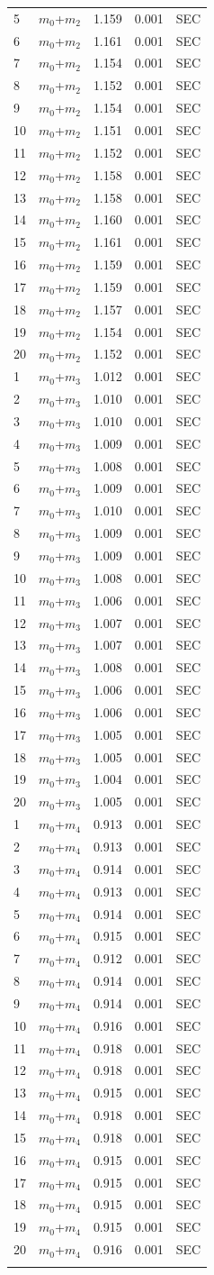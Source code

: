 \documentclass[11pt,a4paper]{article}
\begin{document}
\begin{longtable}[]{@{}lllll@{}}
5 & $m_0$+$m_2$ & 1.159 & 0.001 & SEC \tabularnewline
6 & $m_0$+$m_2$ & 1.161 & 0.001 & SEC \tabularnewline
7 & $m_0$+$m_2$ & 1.154 & 0.001 & SEC \tabularnewline
8 & $m_0$+$m_2$ & 1.152 & 0.001 & SEC \tabularnewline
9 & $m_0$+$m_2$ & 1.154 & 0.001 & SEC \tabularnewline
10 & $m_0$+$m_2$ & 1.151 & 0.001 & SEC \tabularnewline
11 & $m_0$+$m_2$ & 1.152 & 0.001 & SEC \tabularnewline
12 & $m_0$+$m_2$ & 1.158 & 0.001 & SEC \tabularnewline
13 & $m_0$+$m_2$ & 1.158 & 0.001 & SEC \tabularnewline
14 & $m_0$+$m_2$ & 1.160 & 0.001 & SEC \tabularnewline
15 & $m_0$+$m_2$ & 1.161 & 0.001 & SEC \tabularnewline
16 & $m_0$+$m_2$ & 1.159 & 0.001 & SEC \tabularnewline
17 & $m_0$+$m_2$ & 1.159 & 0.001 & SEC \tabularnewline
18 & $m_0$+$m_2$ & 1.157 & 0.001 & SEC \tabularnewline
19 & $m_0$+$m_2$ & 1.154 & 0.001 & SEC \tabularnewline
20 & $m_0$+$m_2$ & 1.152 & 0.001 & SEC \tabularnewline
1 & $m_0$+$m_3$ & 1.012 & 0.001 & SEC \tabularnewline
2 & $m_0$+$m_3$ & 1.010 & 0.001 & SEC \tabularnewline
3 & $m_0$+$m_3$ & 1.010 & 0.001 & SEC \tabularnewline
4 & $m_0$+$m_3$ & 1.009 & 0.001 & SEC \tabularnewline
5 & $m_0$+$m_3$ & 1.008 & 0.001 & SEC \tabularnewline
6 & $m_0$+$m_3$ & 1.009 & 0.001 & SEC \tabularnewline
7 & $m_0$+$m_3$ & 1.010 & 0.001 & SEC \tabularnewline
8 & $m_0$+$m_3$ & 1.009 & 0.001 & SEC \tabularnewline
9 & $m_0$+$m_3$ & 1.009 & 0.001 & SEC \tabularnewline
10 & $m_0$+$m_3$ & 1.008 & 0.001 & SEC \tabularnewline
11 & $m_0$+$m_3$ & 1.006 & 0.001 & SEC \tabularnewline
12 & $m_0$+$m_3$ & 1.007 & 0.001 & SEC \tabularnewline
13 & $m_0$+$m_3$ & 1.007 & 0.001 & SEC \tabularnewline
14 & $m_0$+$m_3$ & 1.008 & 0.001 & SEC \tabularnewline
15 & $m_0$+$m_3$ & 1.006 & 0.001 & SEC \tabularnewline
16 & $m_0$+$m_3$ & 1.006 & 0.001 & SEC \tabularnewline
17 & $m_0$+$m_3$ & 1.005 & 0.001 & SEC \tabularnewline
18 & $m_0$+$m_3$ & 1.005 & 0.001 & SEC \tabularnewline
19 & $m_0$+$m_3$ & 1.004 & 0.001 & SEC \tabularnewline
20 & $m_0$+$m_3$ & 1.005 & 0.001 & SEC \tabularnewline
1 & $m_0$+$m_4$ & 0.913 & 0.001 & SEC \tabularnewline
2 & $m_0$+$m_4$ & 0.913 & 0.001 & SEC \tabularnewline
3 & $m_0$+$m_4$ & 0.914 & 0.001 & SEC \tabularnewline
4 & $m_0$+$m_4$ & 0.913 & 0.001 & SEC \tabularnewline
5 & $m_0$+$m_4$ & 0.914 & 0.001 & SEC \tabularnewline
6 & $m_0$+$m_4$ & 0.915 & 0.001 & SEC \tabularnewline
7 & $m_0$+$m_4$ & 0.912 & 0.001 & SEC \tabularnewline
8 & $m_0$+$m_4$ & 0.914 & 0.001 & SEC \tabularnewline
9 & $m_0$+$m_4$ & 0.914 & 0.001 & SEC \tabularnewline
10 & $m_0$+$m_4$ & 0.916 & 0.001 & SEC \tabularnewline
11 & $m_0$+$m_4$ & 0.918 & 0.001 & SEC \tabularnewline
12 & $m_0$+$m_4$ & 0.918 & 0.001 & SEC \tabularnewline
13 & $m_0$+$m_4$ & 0.915 & 0.001 & SEC \tabularnewline
14 & $m_0$+$m_4$ & 0.918 & 0.001 & SEC \tabularnewline
15 & $m_0$+$m_4$ & 0.918 & 0.001 & SEC \tabularnewline
16 & $m_0$+$m_4$ & 0.915 & 0.001 & SEC \tabularnewline
17 & $m_0$+$m_4$ & 0.915 & 0.001 & SEC \tabularnewline
18 & $m_0$+$m_4$ & 0.915 & 0.001 & SEC \tabularnewline
19 & $m_0$+$m_4$ & 0.915 & 0.001 & SEC \tabularnewline
20 & $m_0$+$m_4$ & 0.916 & 0.001 & SEC \tabularnewline
\bottomrule
\label{expdata2}
\end{longtable}
\end{document}
